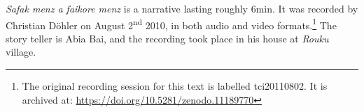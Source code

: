 \textit{Safak menz a faikore menz} is a narrative lasting roughly 6min. It was recorded by Christian Döhler on August 2\textsuperscript{nd} 2010, in both audio and video formats.\footnote{The original recording session for this text is labelled tci20110802. It is archived at: \href{https://doi.org/10.5281/zenodo.11189770}{https://doi.org/10.5281/zenodo.11189770}} The story teller is Abia Bai, and the recording took place in his house at \textit{Rouku} village.